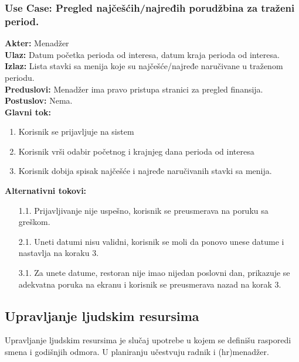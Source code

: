 \documentclass{article}
\begin{document}
\subsubsection{\textbf{Use Case}: Pregled najčešćih/najređih porudžbina za traženi period.}
\textbf{Akter:} Menadžer\\
\textbf{Ulaz:} Datum početka perioda od interesa, datum kraja perioda od interesa.\\
\textbf{Izlaz:} Lista stavki sa menija koje su najčešće/najređe naručivane u traženom periodu.\\
\textbf{Preduslovi:} Menadžer ima pravo pristupa stranici za pregled finansija.\\
\textbf{Postuslov:} Nema.\\
\textbf{Glavni tok:}
\begin{enumerate}
\item Korisnik se prijavljuje na sistem
\item Korisnik vrši odabir početnog i krajnjeg dana perioda od interesa
\item Korisnik dobija spisak najčešće i najređe naručivanih stavki sa menija.
\end{enumerate}
\textbf{Alternativni tokovi:}\\
\begin{itemize}
\item [1.1.] Prijavljivanje nije uspešno, korisnik se preusmerava na poruku sa greškom.
\item [2.1.] Uneti datumi nisu validni, korisnik se moli da ponovo unese datume i nastavlja na koraku 3.
\item [3.1.] Za unete datume, restoran nije imao nijedan poslovni dan, prikazuje se adekvatna poruka na ekranu i korisnik se preusmerava nazad na korak 3.
\end{itemize}


\subsection{Upravljanje ljudskim resursima}
Upravljanje ljudskim resursima je slučaj upotrebe u kojem se definišu rasporedi smena i godišnjih odmora. U planiranju učestvuju radnik i (hr)menadžer.
\end{document}
